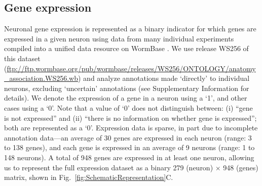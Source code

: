 \documentclass[10pt,letterpaper]{article}
\begin{document}
\subsection*{Gene expression}
Neuronal gene expression is represented as a binary indicator for which genes are expressed in a given neuron using data from many individual experiments compiled into a unified data resource on WormBase \cite{Harris:2009kd}.
We use release WS256 of this dataset (\url{ftp://ftp.wormbase.org/pub/wormbase/releases/WS256/ONTOLOGY/anatomy_association.WS256.wb}) and analyze annotations made `directly' to individual neurons, excluding `uncertain' annotations (see Supplementary Information for details).
We denote the expression of a gene in a neuron using a `1', and other cases using a `0'.
Note that a value of `0' does not distinguish between:
(i) ``gene is not expressed'' and
(ii) ``there is no information on whether gene is expressed''; both are represented as a `0'.
Expression data is sparse, in part due to incomplete annotation data---an average of 30 genes are expressed in each neuron (range: 3 to 138 genes), and each gene is expressed in an average of 9 neurons (range: 1 to 148 neurons).
A total of 948 genes are expressed in at least one neuron, allowing us to represent the full expression dataset as a binary 279 (neuron) $\times$ 948 (genes) matrix, shown in Fig.~\ref{fig:SchematicRepresentation}C.
\end{document}
